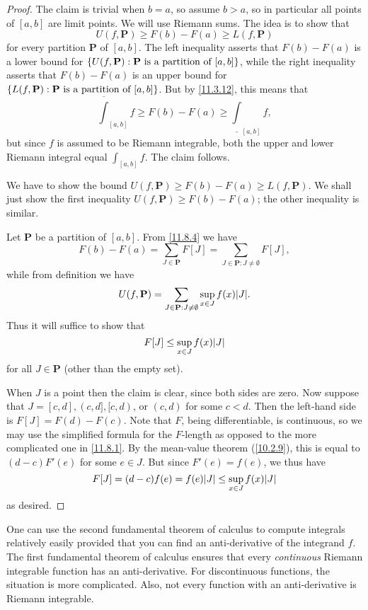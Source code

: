 \begin{proof}
  The claim is trivial when \(b = a\), so assume \(b > a\), so in particular all points of \([a, b]\) are limit points.
  We will use Riemann sums.
  The idea is to show that
  \[
    U(f, \mathbf{P}) \geq F(b) - F(a) \geq L(f, \mathbf{P})
  \]
  for every partition \(\mathbf{P}\) of \([a, b]\).
  The left inequality asserts that \(F(b) - F(a)\) is a lower bound for \(\left\lbrace U(f, \mathbf{P}) : \mathbf{P} \text{ is a partition of } [a, b]\right\rbrace\), while the right inequality asserts that \(F(b) - F(a)\) is an upper bound for \(\left\lbrace L(f, \mathbf{P}) : \mathbf{P} \text{ is a partition of } [a, b]\right\rbrace\).
  But by \cref{11.3.12}, this means that
  \[
    \overline{\int}_{[a, b]} f \geq F(b) - F(a) \geq \underline{\int}_{[a, b]} f,
  \]
  but since \(f\) is assumed to be Riemann integrable, both the upper and lower Riemann integral equal \(\int_{[a, b]} f\).
  The claim follows.

  We have to show the bound \(U(f, \mathbf{P}) \geq F(b) - F(a) \geq L(f, \mathbf{P})\).
  We shall just show the first inequality \(U(f, \mathbf{P}) \geq F(b) - F(a)\);
  the other inequality is similar.

  Let \(\mathbf{P}\) be a partition of \([a, b]\).
  From \cref{11.8.4} we have
  \[
    F(b) - F(a) = \sum_{J \in \mathbf{P}} F[J] = \sum_{J \in \mathbf{P} : J \neq \emptyset} F[J],
  \]
  while from definition we have
  \[
    U(f, \mathbf{P}) = \sum_{J \in \mathbf{P} : J \neq \emptyset} \sup_{x \in J} f(x) \abs{J}.
  \]
  Thus it will suffice to show that
  \[
    F[J] \leq \sup_{x \in J} f(x) \abs{J}
  \]
  for all \(J \in \mathbf{P}\)
  (other than the empty set).

  When \(J\) is a point then the claim is clear, since both sides are zero.
  Now suppose that \(J = [c, d], (c, d], [c, d)\), or \((c, d)\) for some \(c < d\).
  Then the left-hand side is \(F[J] = F(d) - F(c)\).
  Note that \(F\), being differentiable, is continuous, so we may use the simplified formula for the \(F\)-length as opposed to the more complicated one in \cref{11.8.1}.
  By the mean-value theorem (\cref{10.2.9}), this is equal to \((d - c) F'(e)\) for some \(e \in J\).
  But since \(F'(e) = f(e)\), we thus have
  \[
    F[J] = (d - c) f(e) = f(e) \abs{J} \leq \sup_{x \in J} f(x) \abs{J}
  \]
  as desired.
\end{proof}

\begin{note}
  One can use the second fundamental theorem of calculus to compute integrals relatively easily provided that you can find an anti-derivative of the integrand \(f\).
  The first fundamental theorem of calculus ensures that every \emph{continuous} Riemann integrable function has an anti-derivative.
  For discontinuous functions, the situation is more complicated.
  Also, not every function with an anti-derivative is Riemann integrable.
\end{note}

